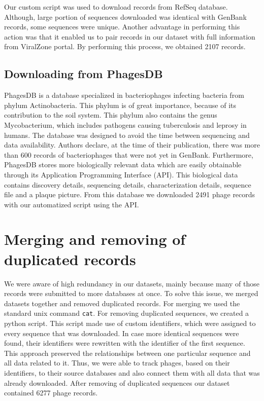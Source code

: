 Our custom script was used to download records from RefSeq database.
Although, large portion of sequences downloaded was identical with GenBank records, some sequences were unique.
Another advantage in performing this action was that it enabled us to pair records in our dataset with full information from ViralZone portal.
By performing this process, we obtained 2107 records.


\subsection{Downloading from PhagesDB}
PhagesDB is a database specialized in bacteriophages infecting bacteria from phylum Actinobacteria.
This phylum is of great importance, because of its contribution to the soil system.
This phylum also contains the genus Mycobacterium, which includes pathogens causing tuberculosis and leprosy in humans.
The database was designed to avoid the time between sequencing and data availability.
Authors declare, at the time of their publication, there was more than 600 records of bacteriophages that were not yet in GenBank.
Furthermore, PhagesDB stores more biologically relevant data which are easily obtainable through its Application Programming Interface (API).
This biological data contains discovery details, sequencing details, characterization details, sequence file and a plaque picture.
From this database we downloaded 2491 phage records with our automatized script using the API.

\section{Merging and removing of duplicated records}
We were aware of high redundancy in our datasets, mainly because many of those records were submitted to more databases at once.
To solve this issue, we merged datasets together and removed duplicated records.
For merging we used the standard unix command \verb|cat|.
For removing duplicated sequences, we created a python script.
This script made use of custom identifiers, which were assigned to every sequence that was downloaded.
In case more identical sequences were found, their identifiers were rewritten with the identifier of the first sequence.
This approach preserved the relationships between one particular sequence and all data related to it.
Thus, we were able to track phages, based on their identifiers, to their source databases and also connect them with all data that was already downloaded.
After removing of duplicated sequences our dataset contained 6277 phage records.

